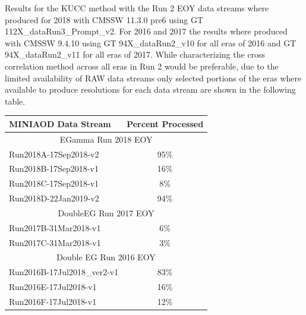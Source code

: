 


Results for the KUCC method with the Run 2 EOY data streams where produced for 2018 with CMSSW 11.3.0 pre6 using GT 112X\_dataRun3\_Prompt\_v2. For 2016 and 2017 the results where produced with CMSSW 9.4.10 using GT 94X\_dataRun2\_v10 for all eras of 2016 and GT 94X\_dataRun2\_v11 for all eras of 2017. While characterizing the cross correlation method across all eras in Run 2 would be preferable, due to the limited availability of RAW data streams only selected portions of the eras where available to produce resolutions for each data stream are shown in the following table.

\begin{center}
 \begin{tabular}{ |l|c| }
 \hline
 MINIAOD Data Stream & Percent Processed \\ 
 \hline
 \multicolumn{2}{|c|}{EGamma Run 2018 EOY }\\
 \hline
 Run2018A-17Sep2018-v2 & 95\%\\
 Run2018B-17Sep2018-v1 & 16\%\\
 Run2018C-17Sep2018-v1 & 8\%\\
 Run2018D-22Jan2019-v2 & 94\%\\
 \hline
 \multicolumn{2}{|c|}{DoubleEG Run 2017 EOY }\\
 \hline
 Run2017B-31Mar2018-v1 & 6\%\\
 Run2017C-31Mar2018-v1 & 3\%\\
 \hline
 \multicolumn{2}{|c|}{Double EG Run 2016 EOY }\\
 \hline
 Run2016B-17Jul2018\_ver2-v1 & 83\%\\
 Run2016E-17Jul2018-v1 & 16\%\\
 Run2016F-17Jul2018-v1 & 12\%\\
 \hline
 \end{tabular}
\end{center}

